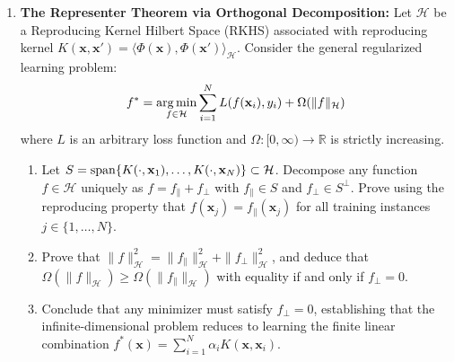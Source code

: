 \begin{enumerate}[label=\textbf{P\arabic*.}]
    \item \textbf{The Representer Theorem via Orthogonal Decomposition:}
    Let $\mathcal{H}$ be a Reproducing Kernel Hilbert Space (RKHS) associated with reproducing kernel $K(\mathbf{x}, \mathbf{x}') = \langle \Phi(\mathbf{x}), \Phi(\mathbf{x}') \rangle_{\mathcal{H}}$. Consider the general regularized learning problem:
    \begin{equation}
    f^* = \operatorname*{arg\,min}_{f \in \mathcal{H}} \sum_{i=1}^N L(f(\mathbf{x}_i), y_i) + \Omega(\|f\|_{\mathcal{H}})
    \end{equation}
    where $L$ is an arbitrary loss function and $\Omega: [0, \infty) \to \mathbb{R}$ is strictly increasing.
    \begin{enumerate}[label=(\alph*)]
        \item Let $S = \operatorname{span}\{K(\cdot, \mathbf{x}_1), \dots, K(\cdot, \mathbf{x}_N)\} \subset \mathcal{H}$. Decompose any function $f \in \mathcal{H}$ uniquely as $f = f_{\|} + f_{\perp}$ with $f_{\|} \in S$ and $f_{\perp} \in S^\perp$. Prove using the reproducing property that $f(\mathbf{x}_j) = f_{\|}(\mathbf{x}_j)$ for all training instances $j \in \{1, \dots, N\}$.
        \item Prove that $\|f\|_{\mathcal{H}}^2 = \|f_{\|}\|_{\mathcal{H}}^2 + \|f_{\perp}\|_{\mathcal{H}}^2$, and deduce that $\Omega(\|f\|_{\mathcal{H}}) \ge \Omega(\|f_{\|}\|_{\mathcal{H}})$ with equality if and only if $f_{\perp} = 0$.
        \item Conclude that any minimizer must satisfy $f_{\perp} = 0$, establishing that the infinite-dimensional problem reduces to learning the finite linear combination $f^*(\mathbf{x}) = \sum_{i=1}^N \alpha_i K(\mathbf{x}, \mathbf{x}_i)$.
    \end{enumerate}


\end{enumerate}
